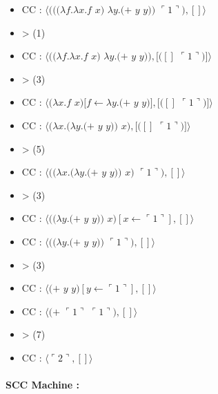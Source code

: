 \documentclass[10pt,a4paper]{article}
\begin{document}
				\begin{multicols}{2}\raggedright{
						\begin{itemize}
							\item[] CC : $\langle(((\lambda f.\lambda x.f$ $x)$ $\lambda y.(+$ $y$ $y))$ $\ulcorner 1\urcorner),[]\rangle$
							\item[] > (1) 
							\item[] CC : $\langle((\lambda f.\lambda x.f$ $x)$ $\lambda y.(+$ $y$ $y)),[([]$ $\ulcorner 1\urcorner)]\rangle$
							\item[] > (3)
							\item[] CC : $\langle(\lambda x.f$ $x)[f \leftarrow \lambda y.(+$ $y$ $y)],[([]$ $\ulcorner 1\urcorner)]\rangle$
							\item[] CC : $\langle(\lambda x.(\lambda y.(+$ $y$ $y))$ $x),[([]$ $\ulcorner 1\urcorner)]\rangle$
							\item[] > (5)
							
						\end{itemize}
						
						\begin{itemize}
							\item[] CC : $\langle((\lambda x.(\lambda y.(+$ $y$ $y))$ $x)$ $\ulcorner 1\urcorner),[]\rangle$
							\item[] > (3) 
							\item[] CC : $\langle((\lambda y.(+$ $y$ $y))$ $x)[x \leftarrow \ulcorner 1\urcorner],[]\rangle$
							\item[] CC : $\langle((\lambda y.(+$ $y$ $y))$ $\ulcorner 1\urcorner),[]\rangle$
							\item[] > (3) 
							\item[] CC : $\langle(+$ $y$ $y)[y \leftarrow \ulcorner 1\urcorner],[]\rangle$
							\item[] CC : $\langle(+$ $\ulcorner 1\urcorner$ $\ulcorner 1\urcorner),[]\rangle$
							\item[] > (7)
							\item[] CC : $\langle\ulcorner 2\urcorner,[]\rangle$
						\end{itemize}
					}
				\end{multicols}
				
				\newpage
			
			
			
			\paragraph{SCC Machine :}
		
\end{document}
